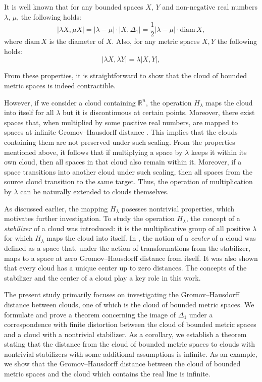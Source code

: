 \documentclass[leqno]{article}
\begin{document}
It is well known that for any bounded spaces $X$, $Y$ and
non-negative real numbers $\lambda$, $\mu$, the following holds:
$$
|\lambda X, \mu X| = |\lambda - \mu| \cdot |X, \Delta_1| =
\frac{1}{2} |\lambda - \mu| \cdot \text{diam}\, X,
$$
where $\text{diam}\, X$ is the diameter of $X$. Also, for any metric
spaces $X,Y$ the following holds:
$$
|\lambda X, \lambda Y| = \lambda |X, Y|,
$$

From these properties, it is straightforward to show that the cloud
of bounded metric spaces is indeed contractible.

However, if we consider a cloud containing $\mathbb{R}^n$, the
operation $H_\lambda$ maps the cloud into itself for all $\lambda$
but it is discontinuous at certain points. Moreover, there exist
spaces that, when multiplied by some positive real numbers, are
mapped to spaces at infinite Gromov--Hausdorff distance
\cite{TuzhBog1}. This implies that the clouds containing them are not
preserved under such scaling.
From the properties mentioned above, it follows that if multiplying a
space by $\lambda$ keeps it within its own cloud, then all spaces in
that cloud also remain within it. Moreover, if a space transitions
into another cloud under such scaling, then all spaces from the
source cloud transition to the same target. Thus, the operation of
multiplication by $\lambda$ can be naturally extended to clouds themselves.

As discussed earlier, the mapping $H_\lambda$ posesses nontrivial
properties, which motivates further investigation. To study the
operation $H_\lambda$, the concept of a \emph{stabilizer} of a cloud
was introduced: it is the multiplicative group of all positive
$\lambda$ for which $H_\lambda$ maps the cloud into itself. In
\cite{TuzhBog2}, the notion of a \emph{center} of a cloud was defined
as a space that, under the action of transformations from the
stabilizer, maps to a space at zero Gromov--Hausdorff distance from
itself. It was also shown that every cloud has a unique center up to
zero distances. The concepts of the stabilizer and the center of a
cloud play a key role in this work.

The present study primarily focuses on investigating the
Gromov--Hausdorff distance between clouds, one of which is the cloud
of bounded metric spaces. We formulate and prove a theorem concerning
the image of $\Delta_1$ under a correspondence with finite distortion
between the cloud of bounded metric spaces and a cloud with a
nontrivial stabilizer. As a corollary, we establish a theorem stating
that the distance from the cloud of bounded metric spaces to clouds
with nontrivial stabilizers with some additional assumptions is
infinite. As an example, we show that the Gromov--Hausdorff distance
between the cloud of bounded metric spaces and the cloud which
contains the real line is infinite.
\end{document}
